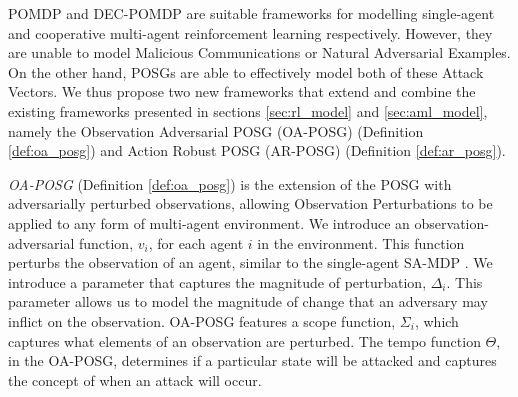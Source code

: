 \documentclass[conference,compsoc]{IEEEtran}
\begin{document}
POMDP and DEC-POMDP are suitable frameworks for modelling single-agent and cooperative multi-agent reinforcement learning respectively. However, they are unable to model Malicious Communications or Natural Adversarial Examples. On the other hand, POSGs are able to effectively model both of these Attack Vectors.
We thus propose two new frameworks that extend and combine the existing frameworks presented in sections \ref{sec:rl_model} and \ref{sec:aml_model}, namely the Observation Adversarial POSG (OA-POSG) (Definition \ref{def:oa_posg}) and Action Robust POSG (AR-POSG) (Definition \ref{def:ar_posg}).


\textit{OA-POSG} (Definition \ref{def:oa_posg}) is the extension of the POSG with adversarially perturbed observations, allowing Observation Perturbations to be applied to any form of multi-agent environment. We introduce an observation-adversarial function, $v_i$, for each agent $i$ in the environment. This function perturbs the observation of an agent, similar to the single-agent SA-MDP \cite{zhang_robust_2020-1}. We introduce a parameter that captures the magnitude of perturbation, $\Delta_i$. This parameter allows us to model the magnitude of change that an adversary may inflict on the observation. OA-POSG features a scope function, $\Sigma_i$, which captures what elements of an observation are perturbed. The tempo function $\Theta$, in the OA-POSG, determines if a particular state will be attacked and captures the concept of when an attack will occur.
\end{document}
